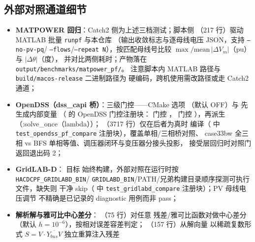\subsection{外部对照通道细节}
\begin{itemize}
  \item \textbf{MATPOWER 回归}：Catch2 侧为上述三档测试；脚本侧
        （217 行）驱动 MATLAB 批量
        \texttt{runpf} 与本仓库 
        （输出收敛标志与逐母线电压 JSON，支持 \texttt{--no-pv-pq}/
        \texttt{--flows}/\texttt{--repeat N}），按匹配母线号比较
        $\max/\mathrm{mean}\,|\Delta V_m|$（pu）与 $|\Delta\theta|$（度），
        并对比两侧耗时；产物落在 \texttt{output/benchmarks/matpower\_pf/}。
        注意脚本内 MATLAB 路径与 \texttt{build/macos-release} 二进制路径为
        硬编码，跨机使用需改路径或走 Catch2 通道；
  \item \textbf{OpenDSS（dss\_capi 桥）}：三级门控——CMake 选项
        （默认 OFF）与
         先生成内部变量
        （ 的 OpenDSS 门控注册块：
         门控 ，
         门控 ），再派生
        （:solve\_once（lambda））；
        （3717 行）仅在后者为真时
        编译（ 中 \texttt{test\_opendss\_pf\_compare}
        注册块），覆盖单相/三相桥对照、
        case33bw 全三相 vs BFS 单相等值、调压器闭环与变压器分接头投影，
        接受层回归时对照门返回退出码 2；
  \item \textbf{GridLAB-D}： 目标
        始终构建，外部对照在运行时按 \texttt{HACDCPF\_GRIDLABD\_BIN}/
        \texttt{GRIDLABD\_BIN}/PATH/兄弟构建目录顺序探测可执行文件，缺失则
        干净 skip（ 中 \texttt{test\_gridlabd\_compare}
        注册块）；PV 母线电压调节
        不精确是已记录的 diagnostic 用例而非 pass；
  \item \textbf{解析解与雅可比中心差分}：
        （75 行）对任意
        残差/雅可比函数对做中心差分（默认 $h=10^{-6}$），按相对误差容差判定；
        （157 行）从解向量
        以稀疏复数形式 $S=V\cdot\overline{Y_{bus}V}$ 独立重算注入残差

\end{itemize}
